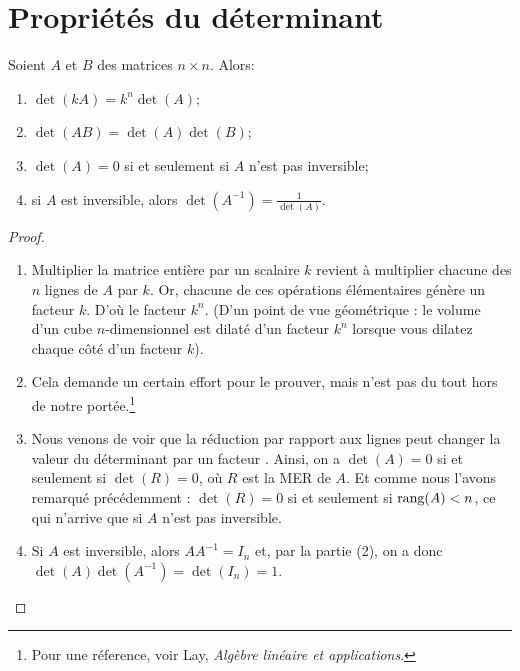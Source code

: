 
\section{Propriétés du déterminant}

\begin{theorem}
Soient $A$ et $B$ des matrices $n\times n$.  Alors:
\begin{enumerate}[(1)]
\item $\det(kA) = k^n\det(A)$;
\item $\det(AB) = \det(A)\det(B)$;
\item $\det(A) = 0$ si et seulement si $A$ n'est pas inversible;
\item si $A$ est inversible, alors $\det(A^{-1}) = \frac{1}{\det(A)}$.
\end{enumerate}
\end{theorem}

\begin{proof}
\begin{enumerate}[(1)]
	\item Multiplier la matrice entière par un scalaire $k$ revient à multiplier chacune des $n$ lignes de $A$ par $k$. Or, chacune de ces opérations élémentaires g\'en\`ere un facteur $k$. D'où le facteur $k^n$.
(D'un point de vue géométrique : le volume d'un cube $n$-dimensionnel est dilaté d'un facteur $k^n$ lorsque vous dilatez chaque c\^ot\'e d'un facteur $k$).

	\item Cela demande un certain effort pour le prouver, mais n'est pas du tout hors de notre portée.\footnote{Pour une r\'eference, voir Lay, 
\emph{Alg\`ebre lin\'eaire et applications}. }

	\item Nous venons de voir que la réduction par rapport aux lignes peut changer la valeur du 
déterminant par un facteur .  Ainsi, on a $\det(A) = 0$
si et seulement si $\det(R) = 0$, où $R$ est la MER de $A$.
Et comme nous l'avons remarqué précédemment : $\det(R)=0$ si et seulement si $\textrm{rang}(A)<n$, ce qui n'arrive que si $A$ n'est pas inversible.

	\item Si $A$ est inversible, alors $AA^{-1} = I_n$ et, par la partie (2), on a donc
$\det(A) \det(A^{-1}) = \det(I_n) = 1$.
\end{enumerate}
\end{proof} 








